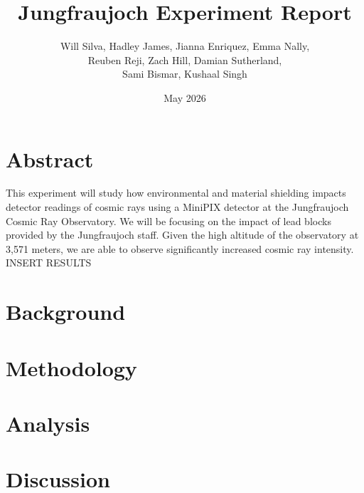 \documentclass{article}
\title{Jungfraujoch Experiment Report}
\author{Will Silva, Hadley James, Jianna Enriquez, Emma Nally, \\Reuben Reji, Zach Hill, Damian Sutherland, \\Sami Bismar, Kushaal Singh}
\date{May 2026}
\begin{document}
\maketitle

\section*{Abstract}
This experiment will study how environmental and material shielding impacts detector 
readings of cosmic rays using a MiniPIX detector at the Jungfraujoch Cosmic Ray Observatory. 
We will be focusing on the impact of lead blocks provided by the Jungfraujoch staff. Given 
the high altitude of the observatory at 3,571 meters, we are able to observe significantly 
increased cosmic ray intensity. INSERT RESULTS

\section*{Background}


\section*{Methodology}
\section*{Analysis}
\section*{Discussion}
\end{document}
